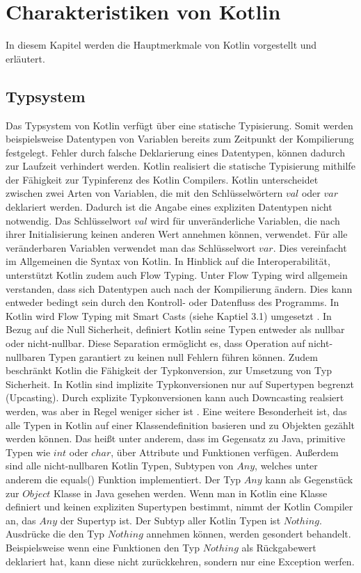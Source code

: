 \documentclass{article}
\begin{document}
\section{Charakteristiken von Kotlin}
In diesem Kapitel werden die Hauptmerkmale von Kotlin vorgestellt und erläutert.
\subsection{Typsystem}
Das Typsystem von Kotlin verfügt über eine statische Typisierung. Somit werden beispielsweise Datentypen von Variablen bereits zum Zeitpunkt der Kompilierung festgelegt. Fehler durch falsche Deklarierung eines Datentypen, können dadurch zur Laufzeit verhindert werden. Kotlin realisiert die statische Typisierung mithilfe der Fähigkeit zur Typinferenz des Kotlin Compilers. Kotlin unterscheidet zwischen zwei Arten von Variablen, die mit den Schlüsselwörtern $val$ oder $var$ deklariert werden.  Dadurch ist die Angabe eines expliziten Datentypen nicht notwendig. Das Schlüsselwort $val$ wird für unveränderliche Variablen, die nach ihrer Initialisierung keinen anderen Wert annehmen können, verwendet. Für alle veränderbaren Variablen verwendet man das Schlüsselwort $var$. Dies vereinfacht im Allgemeinen die Syntax von Kotlin. In Hinblick auf die Interoperabilität, unterstützt Kotlin zudem auch Flow Typing. Unter Flow Typing wird allgemein verstanden, dass sich Datentypen auch nach der Kompilierung ändern. Dies kann entweder bedingt sein durch den Kontroll- oder Datenfluss des Programms. In Kotlin wird Flow Typing mit Smart Casts (siehe Kaptiel 3.1) umgesetzt \cite{KotlinLangSpec}. \newline
In Bezug auf die Null Sicherheit, definiert Kotlin seine Typen entweder als nullbar oder nicht-nullbar. Diese Separation ermöglicht es, dass Operation auf nicht-nullbaren Typen garantiert zu keinen null Fehlern führen können. Zudem beschränkt Kotlin die Fähigkeit der Typkonversion, zur Umsetzung von Typ Sicherheit. In Kotlin sind implizite Typkonversionen nur auf Supertypen begrenzt (Upcasting). Durch explizite Typkonversionen kann auch Downcasting realsiert werden, was aber in Regel weniger sicher ist \cite{KotlinLangSpec}.\newline
Eine weitere Besonderheit ist, das alle Typen in Kotlin auf einer Klassendefinition basieren und zu Objekten gezählt werden können. Das heißt unter anderem, dass im Gegensatz zu Java, primitive Typen wie $int$ oder $char$, über Attribute und Funktionen verfügen. Außerdem sind alle nicht-nullbaren Kotlin Typen, Subtypen von $Any$, welches unter anderem die equals() Funktion implementiert. Der Typ $Any$ kann als Gegenstück zur $Object$ Klasse in Java gesehen werden. Wenn man in Kotlin eine Klasse definiert und keinen expliziten Supertypen bestimmt, nimmt der Kotlin Compiler an, das $Any$ der Supertyp ist. Der Subtyp aller Kotlin Typen ist $Nothing$. Ausdrücke die den Typ $Nothing$ annehmen können, werden gesondert behandelt. Beispielsweise wenn eine Funktionen den Typ $Nothing$ als Rückgabewert deklariert hat, kann diese nicht zurückkehren, sondern nur eine Exception werfen. \cite{KotlinLangSpec}
\end{document}
